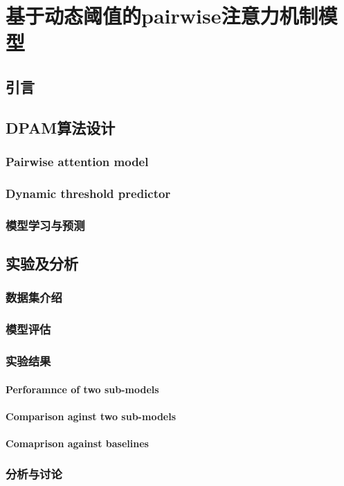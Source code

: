 
\chapter{基于动态阈值的pairwise注意力机制模型}


\section{引言}


\section{DPAM算法设计}

\subsection{Pairwise attention model}

\subsection{Dynamic threshold predictor}

\subsection{模型学习与预测}


\section{实验及分析}

\subsection{数据集介绍}

\subsection{模型评估}

\subsection{实验结果}

\subsubsection{Perforamnce of two sub-models}

\subsubsection{Comparison aginst two sub-models}

\subsubsection{Comaprison against baselines}

\subsection{分析与讨论}

